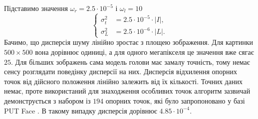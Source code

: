 Підставимо значення $\omega_r = 2.5 \cdot 10^{-5}$ і $\omega_l = 10$
\begin{equation*}
  \begin{cases}
    \sigma^2_t &= 2.5 \cdot 10^{-5} \cdot \left| I \right|, \\
    \sigma_L^2 &= 2.5 \cdot 10^{-6} \cdot \left| L \right|.
  \end{cases}
\end{equation*}
Бачимо,
що дисперсія шуму лінійно зростає з площею зображення.
Для картинки $500 \times 500$ вона дорівнює одиниці,
а для одного мегапікселя це значення вже сягає $25$.
Для більших зображень сама модель голови має замалу точність,
тому немає сенсу розглядати поведінку дисперсії на них.
Дисперсія відхилення опорних точок від дійсного положення
лінійно залежить від їх кількості.
Точних даних немає,
проте використаний для знаходження особливих точок алгоритм
зазвичай демонструється з набором із $194$ опорних точок,
які було запропоновано у базі PUT Face \cite{put-face:2008}.
В такому випадку дисперсія дорівнює $4.85 \cdot 10^{-4}$.
